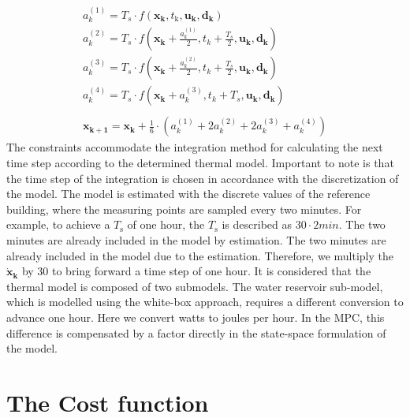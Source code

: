     \begin{align}
        \label{Runke-Kutta}
        a_k^{(1)} = T_s \cdot f(\mathbf{x_k},t_\text{k},\mathbf{u_k},\mathbf{d_k}) \\
        a_k^{(2)} = T_s \cdot f(\mathbf{x_k}+\frac{a_k^{(1)}}{2},t_k+\frac{T_s}{2},\mathbf{u_k},\mathbf{d_k})\nonumber\\
        a_k^{(3)} = T_s \cdot f(\mathbf{x_k}+\frac{a_k^{(2)}}{2},t_k+\frac{T_s}{2},\mathbf{u_k},\mathbf{d_k})\nonumber\\
        a_k^{(4)} = T_s \cdot f(\mathbf{x_k}+a_k^{(3)},t_k+T_s,\mathbf{u_k},\mathbf{d_k})\nonumber\\
        \nonumber\\
        \mathbf{x_{k+1}} = \mathbf{x_k} + \frac{1}{6}\cdot (a_k^{(1)} + 2 a_k^{(2)} + 2 a_k^{(3)} + a_k^{(4)})\nonumber
    \end{align}
The constraints accommodate the integration method for calculating the next time step according to the determined thermal model.
Important to note is that the time step of the integration is chosen in accordance with the discretization of the model. The model is estimated with the discrete values of the reference building, where the measuring points are sampled every two minutes. For example, to achieve a $T_\text{s}$ of one hour, the $T_\text{s}$ is described as $30 \cdot 2 min$. The two minutes are already included in the model by estimation. The two minutes are already included in the model due to the estimation. Therefore, we multiply the $\mathbf{\dot{x}_\text{k}}$ by 30 to bring forward a time step of one hour. It is considered that the thermal model is composed of two submodels. The water reservoir sub-model, which is modelled using the white-box approach, requires a different conversion to advance one hour. Here we convert watts to joules per hour. In the MPC, this difference is compensated by a factor directly in the state-space formulation of the model.

\section{The Cost function}
\label{section:thecostfunction}

